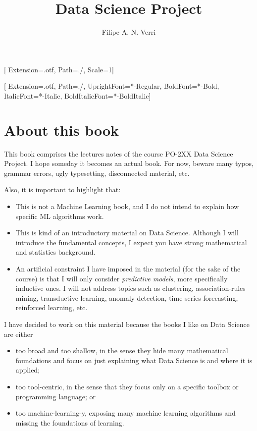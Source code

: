 \documentclass[a5paper]{book}
\begin{document}
[
  Extension={.otf},
  Path=./,
  Scale=1]

\setmainfont{STIXTwoText}[
  Extension={.otf},
  Path=./,
  UprightFont={*-Regular},
  BoldFont={*-Bold},
  ItalicFont={*-Italic},
  BoldItalicFont={*-BoldItalic}]

\title{Data Science Project}
\author{Filipe A. N. Verri}

\maketitle

\section*{About this book}

This book comprises the lectures notes of the course PO-2XX Data Science Project.
I hope someday it becomes an actual book. For now, beware many typos, grammar errors, ugly
typesetting, disconnected material, etc.

Also, it is important to highlight that:
\begin{itemize}
  \item This is not a Machine Learning book, and I do not intend to explain how specific
    ML algorithms work.
  \item This is kind of an introductory material on Data Science.  Although I will
    introduce the fundamental concepts, I expect you have strong mathematical and
    statistics background.
  \item An artificial constraint I have imposed in the material (for the sake of the
    course) is that I will only consider \emph{predictive models}, more specifically
    inductive ones. I will not address topics such as clustering, association-rules
    mining, transductive learning, anomaly detection, time series forecasting, reinforced
    learning, etc.
\end{itemize}

I have decided to work on this material because the books I like on Data Science are
either
\begin{itemize}
  \item too broad and too shallow, in the sense they hide many mathematical foundations
    and focus on just explaining what Data Science is and where it is applied;
  \item too tool-centric, in the sense that they focus only on a specific toolbox or
    programming language; or
  \item too machine-learning-y, exposing many machine learning algorithms and missing the
    foundations of learning.
\end{itemize}
\end{document}
